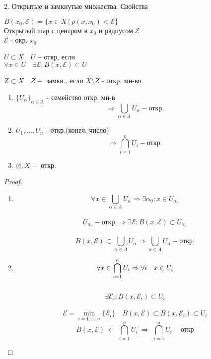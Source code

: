 \documentclass[11pt, fleqn]{article}
\begin{document}
    \begin{question}{2. Открытые и замкнутые множества. Свойства}
        \begin{definition} 
            $B(x_0, \mathcal{E}) = \{x \in X \ | \ \rho(x, x_0) < \mathcal{E}\}$\\
            Открытый шар с центром в $x_0$ и радиусом $\mathcal{E}$\\
            $\mathcal{E}$ - окр.  $x_0$
        \end{definition}
        
        \begin{definition} 
            $U \subset X \quad U -$откр, если\\
            $\forall x \in U \quad \exists \mathcal{E}: B(x, \mathcal{E}) \subset U$
        \end{definition}

        \begin{definition} 
            $Z \subset X \quad Z -$ замкн., если $X \setminus Z$ - откр. мн-во
        \end{definition}

        \begin{theorem}[св-ва откр. мн-в] 
            \begin{enumerate}
                \item $\{ U_\alpha \}_{\alpha \in A}$ - семейство откр. мн-в 
                       \[\Rightarrow \bigcup_{\alpha \in A}U_\alpha - \text{откр.}\]
                \item $U_1,...,U_n$ - откр.(конеч. число) \[\Rightarrow \bigcap_{i = 1}^n U_i - \text{откр.}\] 
                \item $\varnothing, X - $ откр.
            \end{enumerate}
        \end{theorem}
        \begin{proof} 
            \begin{enumerate}
                \item \[\forall x \in \bigcup_{\alpha \in A} U_\alpha \Rightarrow \exists \alpha_0: x \in U_{\alpha_0}\]\\
                       \[U_{\alpha_0} - \text{откр.}\Rightarrow \exists \mathcal{E} : B(x, \mathcal{E}) \subset U_{\alpha_0}\]\\
                       \[B(x, \mathcal{E}) \subset \bigcup_{\alpha \in A} U_\alpha \Rightarrow 
                       \bigcup_{\alpha \in A} U_\alpha - \text{откр.}\]
                \item $$\forall x \in \bigcap_{i = 1}^n U_i \Rightarrow \forall i \quad x \in U_i$$\\
                      $$\exists \mathcal{E}_i : B(x, \mathcal{E}_i) \subset U_i$$\\
                      \[\mathcal{E} = \min_{i = 1,..., n}\{\mathcal{E}_i\} \quad B(x, \mathcal{E}) \subset B(x, \mathcal{E}_i) \subset U_i\]
                      \[B(x, \mathcal{E}) \;\subset\; \bigcap_{i=1}^n U_i\; \Rightarrow\; \bigcap_{i = 1} ^ n U_i - \text{откр}\]
            \end{enumerate}
        \end{proof}


\end{question}
\end{document}
